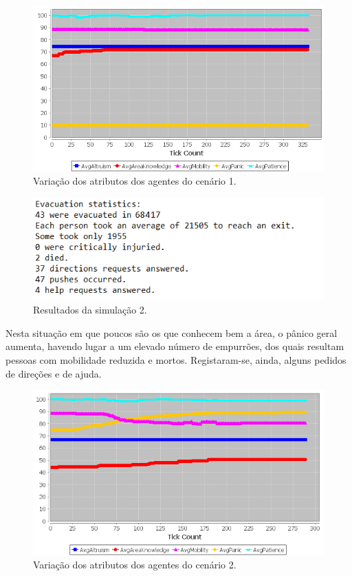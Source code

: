 \documentclass[12pt]{article}
\begin{document}
\begin{titlepage}
\begin{itemize}
\begin{figure}[H]
	\centering
	\includegraphics{graph_sc1.png}
	\caption{Variação dos atributos dos agentes do cenário 1.}
	\label{graph_sc1}
\end{figure}

\begin{figure}[H]
	\centering
	\includegraphics{log_sc2.png}
	\caption{Resultados da simulação 2.}
	\label{log_sc1}
\end{figure}

Nesta situação em que poucos são os que conhecem bem a área, o pânico geral aumenta, havendo lugar a um elevado número de empurrões, dos quais resultam pessoas com mobilidade reduzida e mortos. Registaram-se, ainda, alguns pedidos de direções e de ajuda.

\begin{figure}[H]
	\centering
	\includegraphics{graph_sc2.png}
	\caption{Variação dos atributos dos agentes do cenário 2.}
	\label{graph_sc1}
\end{figure}


\end{itemize}
\end{titlepage}
\end{document}
